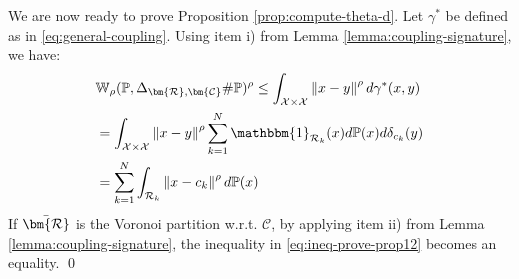 \documentclass[11pt, a4paper, oneside,reqno]{amsart}
\theoremstyle{plain}
\def\prob{\mathbb{P}}
\def\wasserstein{{\mathbb{W}}}
\def\indicator{{\mathbbm{1}}}
\newcommand{\norm}[1]{\left\lVert#1\right\rVert}
\def\sR{{\mathcal{R}}}
\def\sX{{\mathcal{X}}}
\def\bsR{{\bm{\mathcal{R}}}}
\def\bsC{{\bm{\mathcal{C}}}}
\def\vx{{{x}}}
\begin{document}
We are now ready to prove Proposition \ref{prop:compute-theta-d}.
Let $\gamma^*$ be defined as in \eqref{eq:general-coupling}. Using item i) from Lemma \ref{lemma:coupling-signature}, we have:
\begin{align}
    & \wasserstein_\rho(\prob, \Delta_{\bsR, \bsC}\#\prob)^\rho   \leq \int_{\sX \times \sX} \norm{x-y}^{\rho} d\gamma^*(x, y) \label{eq:ineq-prove-prop12} \\ 
    & = \int_{\sX \times \sX} \norm{x-y}^{\rho} \sum_{k=1}^N\indicator_{\sR_k}(\vx) d\prob(x) d\delta_{c_k}(y) \nonumber \\ 
    & =\sum_{k=1}^N \int_{\sR_k} \norm{x-c_k}^\rho d\prob(x) \nonumber 
\end{align}
If $\Bar{\bsR}$ is the Voronoi partition w.r.t. $\bsC$, by applying item ii) from Lemma \ref{lemma:coupling-signature}, the inequality in \eqref{eq:ineq-prove-prop12} becomes an equality.
\qed
\end{document}
